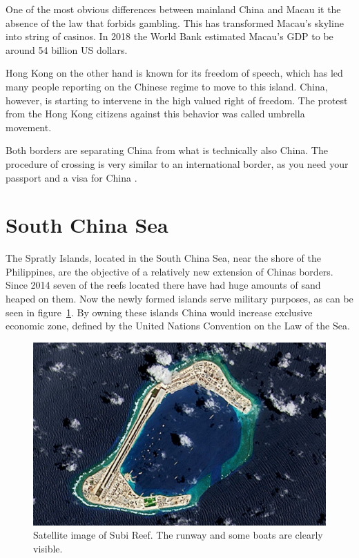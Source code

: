 \documentclass[conference]{IEEEtran}
\begin{document}
	One of the most obvious differences between mainland China and Macau it the absence of the law that forbids gambling. This has transformed Macau's skyline into string of casinos. In 2018 the World Bank estimated Macau's GDP to be around 54 billion US dollars.
	
	Hong Kong on the other hand is known for its freedom of speech, which has led many people reporting on the Chinese regime to move to this island. China, however, is starting to intervene in the high valued right of freedom. The protest from the Hong Kong citizens against this behavior was called umbrella movement.
	
	Both borders are separating China from what is technically also China. The procedure of crossing is very similar to an international border, as you need your passport and a visa for China\cite{macauLifestyle_macauZhuhaiTheUltimateBorderCrossingGuide} \cite{yp_chinaIsErasingItsBorderWithHongKong}.
	
	\section{South China Sea}
	The Spratly Islands, located in the South China Sea, near the shore of the Philippines, are the objective of a relatively new extension of Chinas borders. Since 2014 seven of the reefs located there have had huge amounts of sand heaped on them. Now the newly formed islands serve military purposes, as can be seen in figure~\ref{pic:southChinaSea_subiReef}. By owning these islands China would increase exclusive economic zone, defined by the United Nations Convention on the Law of the Sea\cite{unitedNations_lawOfTheSea}.
	
	\begin{figure}[t]
		\centering
		\includegraphics[width=\linewidth]{img/southChinaSea_subiReef.jpg}
		\caption{Satellite image of Subi Reef\cite{theTelegraph_chinaLandsMilitaryPlaneAtThirdSpratlyIsland}. The runway and some boats are clearly visible.}
		\label{pic:southChinaSea_subiReef}
	\end{figure}
	
\end{document}
